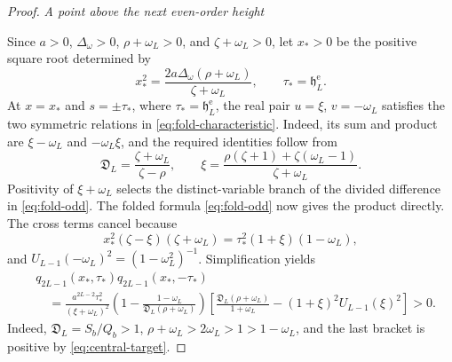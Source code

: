 \documentclass[preprints,article,accept,oneauthor]{Definitions/mdpi}
\numberwithin{equation}{section}
\theoremstyle{mdpi}
\theoremstyle{definition}
\newcommand{\proofstage}[1]{%
  \par\medskip\noindent\textit{#1}\par\nobreak\smallskip}
\begin{document}
\begin{proof}
\proofstage{A point above the next even-order height}
Since \(a>0\), \(\Delta_\omega>0\), \(\rho+\omega_L>0\), and
\(\zeta+\omega_L>0\), let \(x_*>0\) be the positive square root determined
by
\begin{equation}\label{eq:x-star-central}
 x_*^2=\frac{2a\Delta_\omega(\rho+\omega_L)}{\zeta+\omega_L},
 \qquad \tau_*=\mathfrak h_L^{\mathrm e}.
\end{equation}
At \(x=x_*\) and \(s=\pm\tau_*\), where
\(\tau_*=\mathfrak h_L^{\mathrm e}\), the real pair
\(u=\xi\), \(v=-\omega_L\) satisfies the two symmetric relations in
\eqref{eq:fold-characteristic}.  Indeed, its sum and product are
\(\xi-\omega_L\) and \(-\omega_L\xi\), and the required identities
follow from
\[
 \mathfrak D_L=\frac{\zeta+\omega_L}{\zeta-\rho},\qquad
 \xi=\frac{\rho(\zeta+1)+\zeta(\omega_L-1)}{\zeta+\omega_L}.
\]
Positivity of \(\xi+\omega_L\) selects the distinct-variable branch of the
divided difference in \eqref{eq:fold-odd}.
The folded formula \eqref{eq:fold-odd} now gives the product directly.
The cross terms cancel because
\[
 x_*^2(\zeta-\xi)(\zeta+\omega_L)
 =\tau_*^2(1+\xi)(1-\omega_L),
\]
and \(U_{L-1}(-\omega_L)^2=(1-\omega_L^2)^{-1}\).  Simplification yields
\begin{equation}\label{eq:q-product-central}
\begin{aligned}
 &q_{2L-1}(x_*,\tau_*)q_{2L-1}(x_*,-\tau_*)\\
 &\quad=\frac{a^{2L-2}\tau_*^2}{(\xi+\omega_L)^2}
 \left(1-\frac{1-\omega_L}{\mathfrak D_L(\rho+\omega_L)}\right)
 \left[\frac{\mathfrak D_L(\rho+\omega_L)}{1+\omega_L}
       -(1+\xi)^2U_{L-1}(\xi)^2\right]>0.
\end{aligned}
\end{equation}
Indeed, \(\mathfrak D_L=S_b/Q_b>1\),
\(\rho+\omega_L>2\omega_L>1>1-\omega_L\), and the last bracket is
positive by \eqref{eq:central-target}.


\end{proof}
\end{document}
